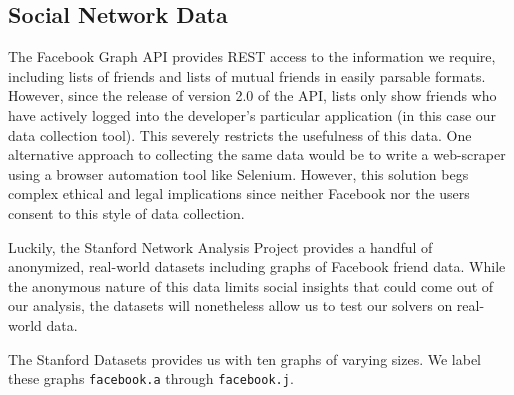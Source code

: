 \documentclass[]{article}
\begin{document}
	\subsection{Social Network Data}
	The Facebook Graph API provides REST access to the information we require, including lists of friends and lists of mutual friends in easily parsable formats. However, since the release of version 2.0 of the API, lists only show friends who have actively logged into the developer's particular application (in this case our data collection tool)\cite{facebook2014}. This severely restricts the usefulness of this data. One alternative approach to collecting the same data would be to write a web-scraper using a browser automation tool like Selenium. However, this solution begs complex ethical and legal implications since neither Facebook nor the users consent to this style of data collection.
	
	Luckily, the Stanford Network Analysis Project provides a handful of anonymized, real-world datasets including graphs of Facebook friend data. While the anonymous nature of this data limits social insights that could come out of our analysis, the datasets will nonetheless allow us to test our solvers on real-world data.
	
	The Stanford Datasets provides us with ten graphs of varying sizes. We label these graphs \texttt{facebook.a} through \texttt{facebook.j}.
	
	
	
\end{document}
